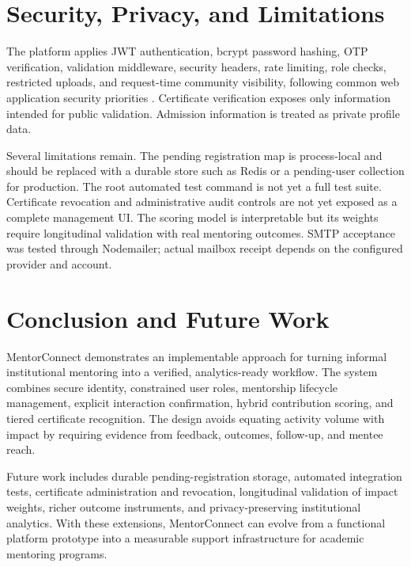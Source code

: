 \documentclass[conference]{IEEEtran}
\begin{document}
\section{Security, Privacy, and Limitations}
The platform applies JWT authentication, bcrypt password hashing, OTP verification, validation middleware, security headers, rate limiting, role checks, restricted uploads, and request-time community visibility, following common web application security priorities \cite{owasp2021}. Certificate verification exposes only information intended for public validation. Admission information is treated as private profile data.

Several limitations remain. The pending registration map is process-local and should be replaced with a durable store such as Redis or a pending-user collection for production. The root automated test command is not yet a full test suite. Certificate revocation and administrative audit controls are not yet exposed as a complete management UI. The scoring model is interpretable but its weights require longitudinal validation with real mentoring outcomes. SMTP acceptance was tested through Nodemailer; actual mailbox receipt depends on the configured provider and account.

\section{Conclusion and Future Work}
MentorConnect demonstrates an implementable approach for turning informal institutional mentoring into a verified, analytics-ready workflow. The system combines secure identity, constrained user roles, mentorship lifecycle management, explicit interaction confirmation, hybrid contribution scoring, and tiered certificate recognition. The design avoids equating activity volume with impact by requiring evidence from feedback, outcomes, follow-up, and mentee reach.

Future work includes durable pending-registration storage, automated integration tests, certificate administration and revocation, longitudinal validation of impact weights, richer outcome instruments, and privacy-preserving institutional analytics. With these extensions, MentorConnect can evolve from a functional platform prototype into a measurable support infrastructure for academic mentoring programs.



\end{document}
